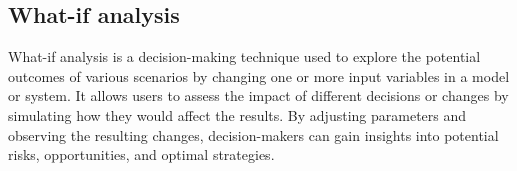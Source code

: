 \subsection{What-if analysis}
What-if analysis is a decision-making technique used to explore the potential outcomes of various scenarios by changing one or more input variables in a model or system. 
It allows users to assess the impact of different decisions or changes by simulating how they would affect the results. 
By adjusting parameters and observing the resulting changes, decision-makers can gain insights into potential risks, opportunities, and optimal strategies. 